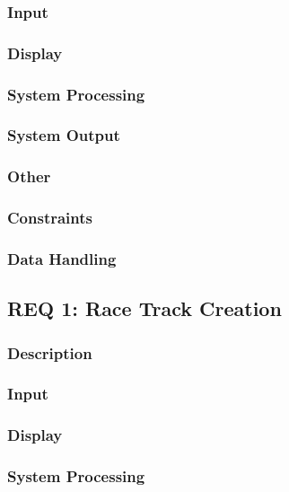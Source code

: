 \documentclass[a4paper, 11pt]{article} %
\begin{document}
\subsubsection{Input}

\subsubsection{Display}

\subsubsection{System Processing}

\subsubsection{System Output}

\subsubsection{Other}

\subsubsection{Constraints}

\subsubsection{Data Handling}

\newpage

\subsection{REQ 1: Race Track Creation}

\subsubsection{Description}

\subsubsection{Input}

\subsubsection{Display}

\subsubsection{System Processing}
\end{document}
